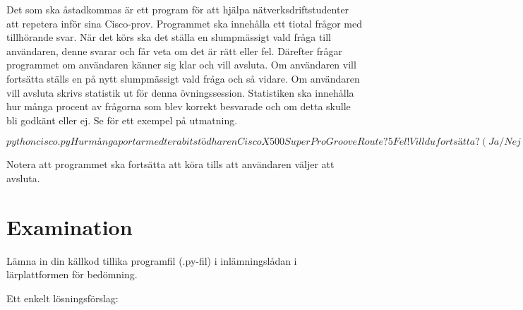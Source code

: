 \documentclass[a4paper,nocourse]{miunasgn}
\begin{document}
Det som ska åstadkommas är ett program för att hjälpa nätverksdriftstudent\-er 
att repetera inför sina Cisco-prov.
Programmet ska innehålla ett tiotal frågor med tillhörande svar.
När det körs ska det ställa en slumpmässigt vald fråga till användaren, denne 
svarar och får veta om det är rätt eller fel.
Därefter frågar programmet om användaren känner sig klar och vill 
avsluta.
Om användaren vill fortsätta ställs en på nytt slumpmässigt vald fråga och så 
vidare.
Om användaren vill avsluta skrivs statistik ut för denna övningssession.
Statistiken ska innehålla hur många procent av frågorna som blev korrekt 
besvarade och om detta skulle bli godkänt eller ej.
Se  för ett exempel på utmatning.

\begin{terminal}[float,label={lst:output},caption={Exempel på utmatning från 
  programmet.}]
$ python cisco.py
Hur många portar med terabitstöd har en Cisco X500 SuperPro GrooveRoute?
5
Fel!
Vill du fortsätta? (Ja/Nej)
Ja
Vad heter Ciscos nuvarande VD?
Rutger Blinka
Fel!
Vill du fortsätta? (Ja/Nej)
Nej
Du hade 0%
$
\end{terminal}

Notera att programmet ska fortsätta att köra tills att användaren väljer att 
avsluta.


\section{Examination}
\label{sec:exam}
Lämna in din källkod tillika programfil (.py-fil) i inlämningslådan 
i lärplattform\-en för bedömning.

\begin{solution}
  Ett enkelt lösningsförslag:
  
\end{solution}


\printbibliography
\end{document}
